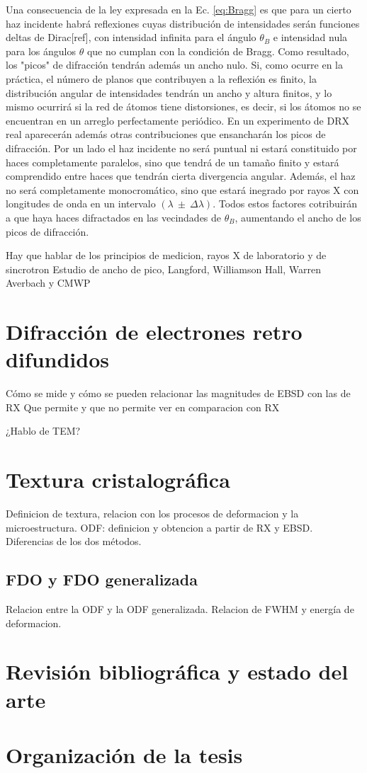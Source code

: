 Una consecuencia de la ley expresada en la Ec. \ref{eq:Bragg} es que para un cierto haz incidente habrá reflexiones cuyas distribución de intensidades serán funciones deltas de Dirac[ref], con intensidad infinita para el ángulo $\theta_{B}$ e intensidad nula para los ángulos $\theta$ que no cumplan con la condición de Bragg. Como resultado, los "picos" de difracción tendrán además un ancho nulo. 
Si, como ocurre en la práctica, el número de planos que contribuyen a la reflexión es finito, la distribución angular de intensidades tendrán un ancho y altura finitos, y lo mismo ocurrirá si la red de átomos tiene distorsiones, es decir, si los átomos no se encuentran en un arreglo perfectamente periódico. 
En un experimento de DRX real aparecerán además otras contribuciones que ensancharán los picos de difracción. 
Por un lado el haz incidente no será puntual ni estará constituido por haces completamente paralelos, sino que tendrá de un tamaño finito y estará comprendido entre haces que tendrán cierta divergencia angular. 
Además, el haz no será completamente monocromático, sino que estará inegrado por rayos X con longitudes de onda en un intervalo $(\lambda \ \pm \ \Delta \lambda)$. 
Todos estos factores cotribuirán a que haya haces difractados en las vecindades de $\theta_{B}$, aumentando el ancho de los picos de difracción.



Hay que hablar de los principios de medicion, rayos X de laboratorio y de sincrotron
Estudio de ancho de pico, Langford, Williamson Hall, Warren Averbach y CMWP

\section{Difracción de electrones retro difundidos}\label{S:EBSD}
Cómo se mide y cómo se pueden relacionar las magnitudes de EBSD con las de RX
Que permite y que no permite ver en comparacion con RX

¿Hablo de TEM?
 
\section{Textura cristalográfica}\label{S:Text}
Definicion de textura, relacion con los procesos de deformacion y la microestructura.
ODF: definicion y obtencion a partir de RX y EBSD. Diferencias de los dos métodos.

\subsection{FDO y FDO generalizada}\label{SS:ODF}
Relacion entre la ODF y la ODF generalizada. Relacion de FWHM y energía de deformacion.

\section{Revisión bibliográfica y estado del arte}\label{S:RB}

\section{Organización de la tesis}\label{S:Org}
